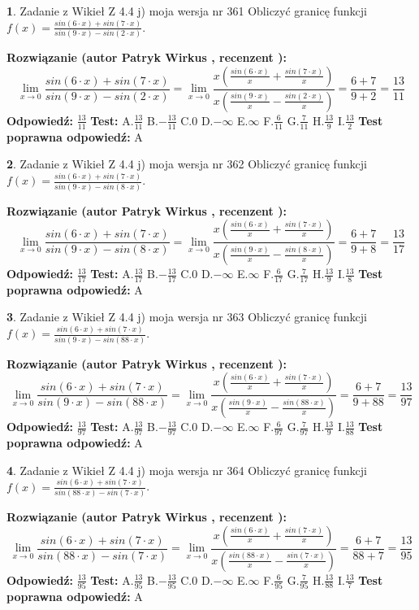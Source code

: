 \documentclass[12pt, a4paper]{article}
\theoremstyle{definition} %
\newtheorem{zad}{}
\newcommand{\zadStart}[1]{\begin{zad}#1\newline}
\newcommand{\zadStop}{\end{zad}}
\newcommand{\rozwStart}[2]{\noindent \textbf{Rozwiązanie (autor #1 , recenzent #2): }\newline}
\newcommand{\rozwStop}{\newline}
\newcommand{\odpStart}{\noindent \textbf{Odpowiedź:}\newline}
\newcommand{\odpStop}{\newline}
\newcommand{\testStart}{\noindent \textbf{Test:}\newline}
\newcommand{\testStop}{\newline}
\newcommand{\kluczStart}{\noindent \textbf{Test poprawna odpowiedź:}\newline}
\newcommand{\kluczStop}{\newline}
\begin{document}
\zadStart{Zadanie z Wikieł Z 4.4 j) moja wersja nr 361}
Obliczyć granicę funkcji $f(x)=\frac{sin(6\cdot x) +sin(7\cdot x)}{sin(9\cdot x) -sin(2\cdot x)}$.
\zadStop
\rozwStart{Patryk Wirkus}{}
$$\lim\limits_{x\to 0}\frac{sin(6\cdot x) +sin(7\cdot x)}{sin(9\cdot x) -sin(2\cdot x)}=\lim\limits_{x\to 0}\frac{x(\frac{sin(6\cdot x)}{x}+\frac{sin(7\cdot x)}{x})}{x(\frac{sin(9\cdot x)}{x}-\frac{sin(2\cdot x)}{x})}=\frac{6+7}{9+2} = \frac{13}{11}$$
\rozwStop
\odpStart
$\frac{13}{11}$
\odpStop
\testStart
A.$\frac{13}{11}$
B.$-\frac{13}{11}$
C.$0$
D.$-\infty$
E.$\infty$
F.$\frac{6}{11}$
G.$\frac{7}{11}$
H.$\frac{13}{9}$
I.$\frac{13}{2}$
\testStop
\kluczStart
A
\kluczStop



\zadStart{Zadanie z Wikieł Z 4.4 j) moja wersja nr 362}
Obliczyć granicę funkcji $f(x)=\frac{sin(6\cdot x) +sin(7\cdot x)}{sin(9\cdot x) -sin(8\cdot x)}$.
\zadStop
\rozwStart{Patryk Wirkus}{}
$$\lim\limits_{x\to 0}\frac{sin(6\cdot x) +sin(7\cdot x)}{sin(9\cdot x) -sin(8\cdot x)}=\lim\limits_{x\to 0}\frac{x(\frac{sin(6\cdot x)}{x}+\frac{sin(7\cdot x)}{x})}{x(\frac{sin(9\cdot x)}{x}-\frac{sin(8\cdot x)}{x})}=\frac{6+7}{9+8} = \frac{13}{17}$$
\rozwStop
\odpStart
$\frac{13}{17}$
\odpStop
\testStart
A.$\frac{13}{17}$
B.$-\frac{13}{17}$
C.$0$
D.$-\infty$
E.$\infty$
F.$\frac{6}{17}$
G.$\frac{7}{17}$
H.$\frac{13}{9}$
I.$\frac{13}{8}$
\testStop
\kluczStart
A
\kluczStop



\zadStart{Zadanie z Wikieł Z 4.4 j) moja wersja nr 363}
Obliczyć granicę funkcji $f(x)=\frac{sin(6\cdot x) +sin(7\cdot x)}{sin(9\cdot x) -sin(88\cdot x)}$.
\zadStop
\rozwStart{Patryk Wirkus}{}
$$\lim\limits_{x\to 0}\frac{sin(6\cdot x) +sin(7\cdot x)}{sin(9\cdot x) -sin(88\cdot x)}=\lim\limits_{x\to 0}\frac{x(\frac{sin(6\cdot x)}{x}+\frac{sin(7\cdot x)}{x})}{x(\frac{sin(9\cdot x)}{x}-\frac{sin(88\cdot x)}{x})}=\frac{6+7}{9+88} = \frac{13}{97}$$
\rozwStop
\odpStart
$\frac{13}{97}$
\odpStop
\testStart
A.$\frac{13}{97}$
B.$-\frac{13}{97}$
C.$0$
D.$-\infty$
E.$\infty$
F.$\frac{6}{97}$
G.$\frac{7}{97}$
H.$\frac{13}{9}$
I.$\frac{13}{88}$
\testStop
\kluczStart
A
\kluczStop



\zadStart{Zadanie z Wikieł Z 4.4 j) moja wersja nr 364}
Obliczyć granicę funkcji $f(x)=\frac{sin(6\cdot x) +sin(7\cdot x)}{sin(88\cdot x) -sin(7\cdot x)}$.
\zadStop
\rozwStart{Patryk Wirkus}{}
$$\lim\limits_{x\to 0}\frac{sin(6\cdot x) +sin(7\cdot x)}{sin(88\cdot x) -sin(7\cdot x)}=\lim\limits_{x\to 0}\frac{x(\frac{sin(6\cdot x)}{x}+\frac{sin(7\cdot x)}{x})}{x(\frac{sin(88\cdot x)}{x}-\frac{sin(7\cdot x)}{x})}=\frac{6+7}{88+7} = \frac{13}{95}$$
\rozwStop
\odpStart
$\frac{13}{95}$
\odpStop
\testStart
A.$\frac{13}{95}$
B.$-\frac{13}{95}$
C.$0$
D.$-\infty$
E.$\infty$
F.$\frac{6}{95}$
G.$\frac{7}{95}$
H.$\frac{13}{88}$
I.$\frac{13}{7}$
\testStop
\kluczStart
A
\kluczStop
\end{document}
